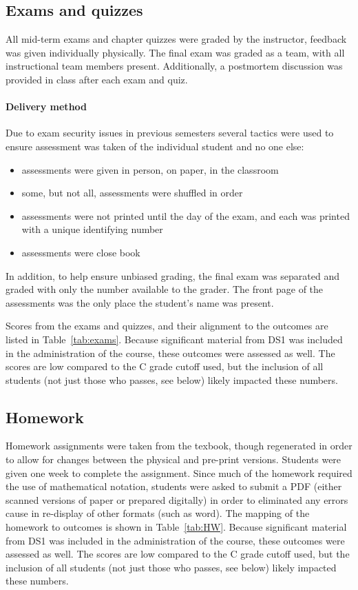 \documentclass[11pt]{article}
\begin{document}
\subsection{Exams and quizzes}
All mid-term exams and chapter quizzes were graded by the instructor, feedback was given individually physically.
The final exam was graded as a team, with all instructional team members present. 
Additionally, a postmortem discussion was provided in class after each exam and quiz. 


\paragraph{Delivery method} 
Due to exam security issues in previous semesters several tactics were used to ensure assessment was taken of the individual student and no one else: 
\begin{itemize}
\item assessments were given in person, on paper, in the classroom
\item some, but not all, assessments were shuffled in order
\item assessments were not printed until the day of the exam, and each was printed with a unique identifying number
\item assessments were close book 
\end{itemize}

In addition, to help ensure unbiased grading, the final exam was separated and graded with only the number available to the grader. 
The front page of the assessments was the only place the student's name was present. 


Scores from the exams and quizzes, and their alignment to the outcomes are listed in Table~\ref{tab:exams}.
Because significant material from DS1 was included in the administration of the course, these outcomes were assessed as well. 
The scores are low compared to the C grade cutoff used, but the inclusion of all students (not just those who passes, see below) likely impacted these numbers. 




\subsection{Homework}
Homework assignments were taken from the texbook, though regenerated in order to allow for changes between the physical and pre-print versions. 
Students were given one week to complete the assignment. 
Since much of the homework required the use of mathematical notation, students were asked to submit a PDF (either scanned versions of paper or prepared digitally) in order to eliminated any errors cause in re-display of other formats (such as word). 
The mapping of the homework to outcomes is shown in Table~\ref{tab:HW}. 
Because significant material from DS1 was included in the administration of the course, these outcomes were assessed as well. 
The scores are low compared to the C grade cutoff used, but the inclusion of all students (not just those who passes, see below) likely impacted these numbers. 
\end{document}
